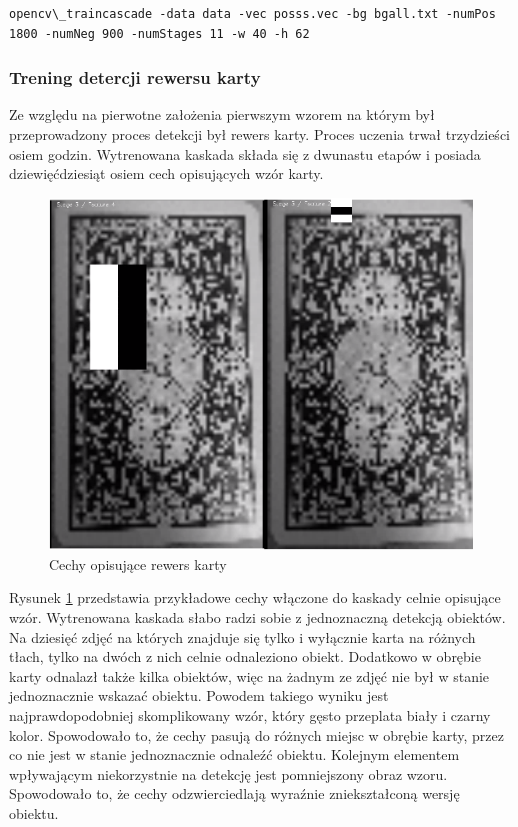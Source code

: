 \begin{lstlisting}
opencv\_traincascade -data data -vec posss.vec -bg bgall.txt -numPos 1800 -numNeg 900 -numStages 11 -w 40 -h 62
\end{lstlisting}

\subsubsection{Trening detercji rewersu karty}

Ze względu na pierwotne założenia pierwszym wzorem na którym był przeprowadzony proces detekcji był rewers karty. Proces uczenia trwał trzydzieści osiem godzin. Wytrenowana kaskada składa się z dwunastu etapów i posiada dziewięćdziesiąt osiem cech opisujących wzór karty.

\begin{figure}[H]
\centering
\includegraphics[scale=0.2]{imgs/cechyRewers.png}
\caption{Cechy opisujące rewers karty}
\label{fig:cechyRewers}
\end{figure}

Rysunek \ref{fig:cechyRewers} przedstawia przykładowe cechy włączone do kaskady celnie opisujące wzór. Wytrenowana kaskada słabo radzi sobie z jednoznaczną detekcją obiektów. Na dziesięć zdjęć na których znajduje się tylko i wyłącznie karta na różnych tłach, tylko na dwóch z nich celnie odnaleziono obiekt. Dodatkowo w obrębie karty odnalazł także kilka obiektów, więc na żadnym ze zdjęć nie był w stanie jednoznacznie wskazać obiektu. Powodem takiego wyniku jest najprawdopodobniej skomplikowany wzór, który gęsto przeplata biały i czarny kolor. Spowodowało to, że cechy pasują do różnych miejsc w obrębie karty, przez co nie jest w stanie jednoznacznie odnaleźć obiektu. Kolejnym elementem wpływającym niekorzystnie na detekcję jest pomniejszony obraz wzoru. Spowodowało to, że cechy odzwierciedlają wyraźnie zniekształconą wersję obiektu.

